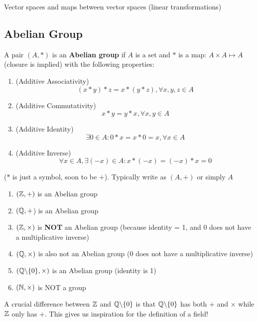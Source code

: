 \begin{goal}
    Vector spaces and maps between vector spaces (linear transformations)
\end{goal}
\subsection{Abelian Group}
\begin{definition} 
    A pair \((A, *)\) is an \textbf{Abelian group} if \(A\) is a set and \(*\) is a map: \(A \times A \mapsto A\) (closure is implied) with the following properties:
    \begin{enumerate}
        \item (Additive Associativity) \[
                  (x * y) * z = x * (y * z), \forall x, y, z \in A
              \]
        \item (Additive Commutativity) \[
                  x * y = y * x, \forall x, y \in A
              \]
        \item (Additive Identity) \[
                  \exists 0 \in A: 0 * x = x * 0 = x, \forall x \in A
              \]
        \item (Additive Inverse) \[
                  \forall x \in A, \exists (-x) \in A: x * (-x) = (-x) * x = 0
              \]
    \end{enumerate}
\end{definition}

\begin{remark}
    (\(*\) is just a symbol, soon to be \(+\)). Typically write as \((A, +)\) or simply \(A\)
\end{remark}

\begin{example}
    \hfill
    \begin{enumerate}
        \item \((\mathbb{Z}, +)\) is an Abelian group
        \item \((\mathbb{Q}, +\)) is an Abelian group
        \item \((\mathbb{Z}, \times)\) is \textbf{NOT} an Abelian group (because identity = 1, and 0 does not have a multiplicative inverse)
        \item \((\mathbb{Q}, \times)\) is also not an Abelian group (0 does not have a multiplicative inverse)
        \item \((\mathbb{Q}\backslash\{0\}, \times)\) is an Abelian group (identity is 1)
        \item \((\mathbb{N}, \times)\) is NOT a group
    \end{enumerate}
\end{example}
\begin{remark}
    A crucial difference between \(\mathbb{Z}\) and \(\mathbb{Q}\backslash\{0\}\) is that \(\mathbb{Q}\backslash\{0\}\) has both \(+\) and \(\times\) while \(\mathbb{Z}\) only has \(+\). This gives us inspiration for the definition of a field!
\end{remark}

